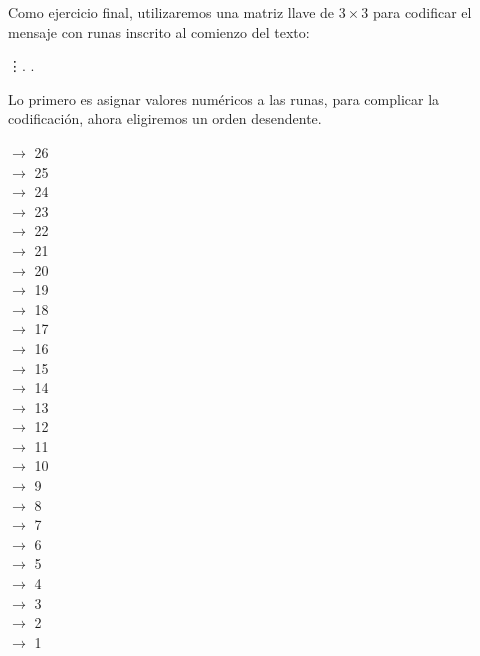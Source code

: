 \documentclass[12pt,a4paper]{article}
\begin{document}
Como ejercicio final, utilizaremos una matriz llave de $3\times 3$ para codificar el mensaje con runas inscrito al comienzo del texto:
\vspace{0.2cm}
\begin{center}
               \vdots  \textara{\th}. \textara{\th}.
\end{center}
\vspace{0.2cm}
 Lo primero es asignar valores num\'ericos a las runas, para complicar la codificaci\'on, ahora eligiremos un orden desendente.

\begin{multicols}{7}
\noindent{}$\rightarrow$ 26\\
$\rightarrow$ 25\\
$\rightarrow$ 24\\
$\rightarrow$ 23\\
$\rightarrow$ 22\\
$\rightarrow$ 21\\
$\rightarrow$ 20\\
$\rightarrow$ 19\\
$\rightarrow$ 18\\
$\rightarrow$ 17\\
$\rightarrow$ 16\\
$\rightarrow$ 15\\
$\rightarrow$ 14\\
$\rightarrow$ 13\\
\textara{\ng}$\rightarrow$ 12\\
$\rightarrow$ 11\\
$\rightarrow$ 10\\
$\rightarrow$ 9\\
$\rightarrow$ 8\\
$\rightarrow$ 7\\
$\rightarrow$ 6\\
\textara{\th } $\rightarrow$ 5\\
$\rightarrow$ 4\\
$\rightarrow$ 3\\
$\rightarrow$ 2\\
$\rightarrow$ 1\\

\end{multicols}
 
\end{document}

